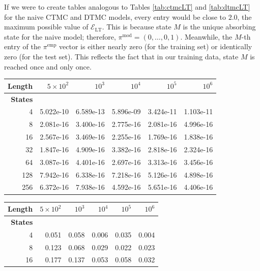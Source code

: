 \documentclass[review,letterpaper,11pt]{elsarticle}
\begin{document}
If we were to create tables analogous to Tables \ref{tab:ctmcLT} and \ref{tab:dtmcLT} for the naive CTMC and DTMC models, every entry would be close to $2.0$, the maximum possible value of $\mathcal{E}_\text{LT}$.  This is because state $M$ is the unique absorbing state for the naive model; therefore, $\pi^\text{mod} = (0, \ldots, 0, 1)$.  Meanwhile, the $M$-th entry of the $\pi^\text{emp}$ vector is either nearly zero (for the training set) or identically zero (for the test set).  This reflects the fact that in our training data, state $M$ is reached once and only once.

\begin{table}[tbh]
\centering
\setlength\tabcolsep{3pt}
\begin{tabular}{rrrrrr}
\toprule
\textbf{Length} &   $5\times 10^2$     &   $10^3$    &   $10^4$   &   $10^5$  &   $10^6$ \\ \midrule
\textbf{States} &               &               &               &               &               \\
4           &  5.022e-10 &  6.589e-13 &  5.896e-09 &  3.424e-11 &  1.103e-11 \\
8           &  2.081e-16 &  3.400e-16 &  2.775e-16 &  2.081e-16 &  4.996e-16 \\
16          &  2.567e-16 &  3.469e-16 &  2.255e-16 &  1.769e-16 &  1.838e-16 \\
32          &  1.847e-16 &  4.909e-16 &  3.382e-16 &  2.818e-16 &  2.324e-16 \\
64          &  3.087e-16 &  4.401e-16 &  2.697e-16 &  3.313e-16 &  3.456e-16 \\
128         &  7.942e-16 &  6.338e-16 &  7.218e-16 &  5.126e-16 &  4.898e-16 \\
256         &  6.372e-16 &  7.938e-16 &  4.592e-16 &  5.651e-16 &  4.406e-16 \\
\bottomrule
\end{tabular} \hspace{1cm}
	\begin{tabular}{rrrrrr}  
		\toprule
		\textbf{Length} &   $5\times 10^2$     &   $10^3$    &   $10^4$   &   $10^5$  &   $10^6$ \\
		\midrule
		\textbf{States} &           &           &           &           &           \\
 	4         &  0.051 &  0.058 &  0.006 &  0.035 &  0.004 \\
        8         &  0.123 &  0.068 &  0.029 &  0.022 &  0.023 \\
       16         &  0.177 &  0.137 &  0.053 &  0.058 &  0.032 \\

\end{tabular}
\end{table}
\end{document}
